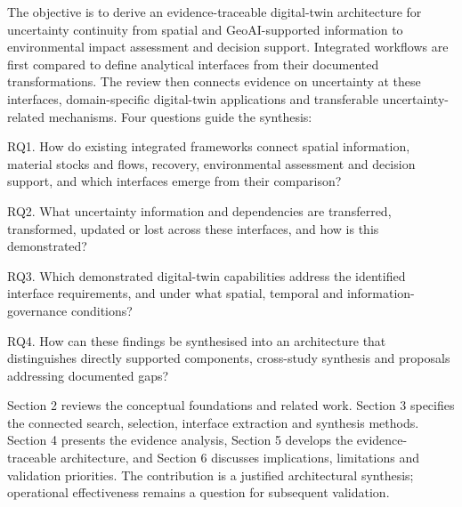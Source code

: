 The objective is to derive an evidence-traceable digital-twin architecture for uncertainty continuity from spatial and GeoAI-supported information to environmental impact assessment and decision support. Integrated workflows are first compared to define analytical interfaces from their documented transformations. The review then connects evidence on uncertainty at these interfaces, domain-specific digital-twin applications and transferable uncertainty-related mechanisms. Four questions guide the synthesis:

RQ1. How do existing integrated frameworks connect spatial information, material stocks and flows, recovery, environmental assessment and decision support, and which interfaces emerge from their comparison?

RQ2. What uncertainty information and dependencies are transferred, transformed, updated or lost across these interfaces, and how is this demonstrated?

RQ3. Which demonstrated digital-twin capabilities address the identified interface requirements, and under what spatial, temporal and information-governance conditions?

RQ4. How can these findings be synthesised into an architecture that distinguishes directly supported components, cross-study synthesis and proposals addressing documented gaps?

Section 2 reviews the conceptual foundations and related work. Section 3 specifies the connected search, selection, interface extraction and synthesis methods. Section 4 presents the evidence analysis, Section 5 develops the evidence-traceable architecture, and Section 6 discusses implications, limitations and validation priorities. The contribution is a justified architectural synthesis; operational effectiveness remains a question for subsequent validation.
